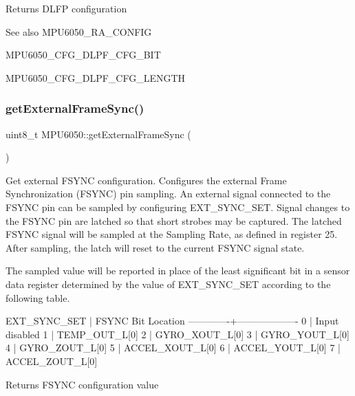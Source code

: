 \begin{DoxyReturn}{Returns}
D\+L\+FP configuration 
\end{DoxyReturn}
\begin{DoxySeeAlso}{See also}
M\+P\+U6050\+\_\+\+R\+A\+\_\+\+C\+O\+N\+F\+IG 

M\+P\+U6050\+\_\+\+C\+F\+G\+\_\+\+D\+L\+P\+F\+\_\+\+C\+F\+G\+\_\+\+B\+IT 

M\+P\+U6050\+\_\+\+C\+F\+G\+\_\+\+D\+L\+P\+F\+\_\+\+C\+F\+G\+\_\+\+L\+E\+N\+G\+TH 
\end{DoxySeeAlso}
\mbox{\label{class_m_p_u6050_a902a7d486cd6ac21f8c378634dc6f59a}} 
\subsubsection{\texorpdfstring{getExternalFrameSync()}{getExternalFrameSync()}}
{\footnotesize\ttfamily uint8\+\_\+t M\+P\+U6050\+::get\+External\+Frame\+Sync (\begin{DoxyParamCaption}{ }\end{DoxyParamCaption})}

Get external F\+S\+Y\+NC configuration. Configures the external Frame Synchronization (F\+S\+Y\+NC) pin sampling. An external signal connected to the F\+S\+Y\+NC pin can be sampled by configuring E\+X\+T\+\_\+\+S\+Y\+N\+C\+\_\+\+S\+ET. Signal changes to the F\+S\+Y\+NC pin are latched so that short strobes may be captured. The latched F\+S\+Y\+NC signal will be sampled at the Sampling Rate, as defined in register 25. After sampling, the latch will reset to the current F\+S\+Y\+NC signal state.

The sampled value will be reported in place of the least significant bit in a sensor data register determined by the value of E\+X\+T\+\_\+\+S\+Y\+N\+C\+\_\+\+S\+ET according to the following table.


\begin{DoxyPre}
EXT\_SYNC\_SET | FSYNC Bit Location
-------------+-------------------
0            | Input disabled
1            | TEMP\_OUT\_L[0]
2            | GYRO\_XOUT\_L[0]
3            | GYRO\_YOUT\_L[0]
4            | GYRO\_ZOUT\_L[0]
5            | ACCEL\_XOUT\_L[0]
6            | ACCEL\_YOUT\_L[0]
7            | ACCEL\_ZOUT\_L[0]
\end{DoxyPre}


\begin{DoxyReturn}{Returns}
F\+S\+Y\+NC configuration value 
\end{DoxyReturn}
\mbox{\label{class_m_p_u6050_a7f786ab4264f40e5a95e8937ec9adcc2}} 
